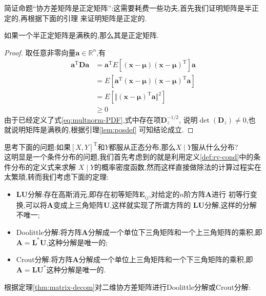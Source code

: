 \documentclass[cn,10pt,citestyle=gb7714-2015,bibstyle=gb7714-2015]{elegantbook}
\newcommand{\mT}{\mathrm{T}}
\begin{document}
简证命题“协方差矩阵是正定矩阵”:这需要耗费一些功夫,首先我们证明矩阵是半正定的,再根据下面的引理
来证明矩阵是正定的.
\begin{lemma}\label{lem:posdef}
  如果一个半正定矩阵是满秩的,那么其是正定矩阵.
\end{lemma}
\begin{proof}
  取任意非零向量$\bm{a}\in\mathbb{R}^n$,有
  \begin{align*}
    \bm{a}^\mT\bm{D}\bm{a}&=\bm{a}^\mT E\left[(\bm{x}-\bm{\mu})(\bm{x}-\bm{\mu})^\mT\right]\bm{a}\\
    &=E\left[\bm{a}^\mT(\bm{x}-\bm{\mu})(\bm{x}-\bm{\mu})^\mT\bm{a}\right]\\
    &=E\left[\Vert(\bm{x}-\bm{\mu})^\mT\bm{a}\Vert^2\right]\\
    &\geqslant 0
  \end{align*}
  由于已经定义了式\eqref{eq:multnorm-PDF},式中存在项$\bm{D}_z^{-1/2}$,
  说明$\det(\bm{D}_z)\neq 0$,也就说明矩阵是满秩的,根据引理\ref{lem:posdef}
  可知结论成立.
\end{proof}
\textcolor{magenta}{\HandRight}思考下面的问题:如果$[X,Y]^\mT$和$Y$都服从正态分布,那么$X\mid Y$服从什么分布?\\
这明显是一个条件分布的问题,我们首先考虑到的就是利用定义\ref{def:rv-cond}中的条件分布的定义式来求解
$X\mid Y$的概率密度函数,然而这样直接做除法的计算过程实在太繁琐,转而我们考虑下面的定理:
\begin{theorem}\label{thm:matrix-decom}
  \begin{itemize}
    \item $\bm{LU}$分解:存在高斯消元,即存在初等矩阵$\bm{E}_{ij}$,对给定的$n$阶方阵$\bm{A}$进行
  初等行变换,可以将$\bm{A}$变成上三角矩阵$\bm{U}$,这样就实现了所谓方阵的
  $\bm{LU}$分解,这样的分解不唯一;
    \item Doolittle分解:将方阵$\bm{A}$分解成一个单位下三角矩阵和一个上三角矩阵的乘积,即$\bm{A}=\bm{L}^*\bm{U}$,这种分解是唯一的;
    \item Crout分解:将方阵$\bm{A}$分解成一个单位上三角矩阵和一个下三角矩阵的乘积,即$\bm{A}=\bm{L}\bm{U}^*$这种分解是唯一的.
  \end{itemize}
\end{theorem}
根据定理\ref{thm:matrix-decom}对二维协方差矩阵进行Doolittle分解或Crout分解:
\end{document}
